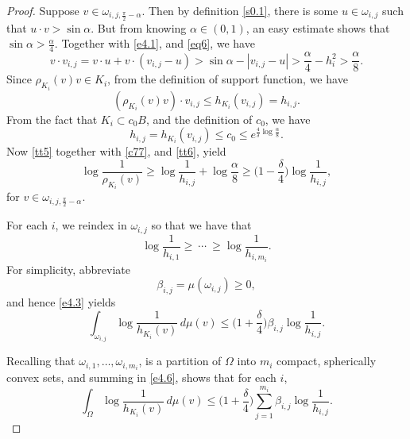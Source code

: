 \documentclass{cpamart1}     %
\theoremstyle{definition}
\theoremstyle{remark}
\begin{document}
\begin{proof}
Suppose $v\in \omega_{i,j,\frac\pi2-\alpha}$.
Then by definition \eqref{s0.1},
there is some $u\in \omega_{i,j}$ such that $u\cdot v>\sin\alpha$.
But from knowing $\alpha\in (0,1)$, an easy estimate shows that
$\sin\alpha > \frac\alpha4$. Together with \eqref{e4.1},
 and \eqref{eq6}, we have
\begin{equation}\label{c77}
v\cdot v_{i,j}= v\cdot u+v\cdot (v_{i,j}-u)>
\sin\alpha-|v_{i,j}-u| > \frac\alpha4-h_i^2 > \frac{\alpha}{8}.
\end{equation}
Since $\rho_{K_i}(v)v\in K_i$, from the definition of support function, we have
\begin{equation}\label{tt5}
(\rho_{K_i}(v)v)\cdot v_{i,j}\leq h_{K_i}(v_{i,j})=h_{i,j}.
\end{equation}
From the fact that $K_i\subset c_0 B$, and the definition of $c_0$, we have
\begin{equation}\label{tt6}
h_{i,j}=h_{K_i}(v_{i,j})\leq c_0\leq e^{\frac{4}{\delta}\log\frac{\alpha}{8}}.
\end{equation}
Now \eqref{tt5} together with \eqref{c77}, and \eqref{tt6}, yield
\begin{equation}\label{e4.4}
\log\frac1{\rho_{K_i}(v)}\geq \log\frac{1}{h_{i,j}}+\log \frac{\alpha}{8}\geq
\Big(1-\frac{\delta}{4}\Big)\log \frac1{h_{i,j}},
\end{equation}
for $v\in \omega_{i,j,\frac\pi2-\alpha}$.

For each $i$, we reindex in $\omega_{i,j}$ so that we have that
\begin{equation}\label{e4.5}
\log \frac1{h_{i,1}}\geq\ \cdots\ \geq  \log \frac1{h_{i,m_i}}.
\end{equation}
For simplicity, abbreviate
$$
\beta_{i,j}=\mu(\omega_{i,j})\geq 0,
$$
and hence \eqref{e4.3} yields
\begin{equation}\label{e4.6}
\int_{\omega_{i,j}}\log\frac1{h_{K_i}(v)}\,d\mu(v)\leq
\big(1+{\textstyle\frac\delta 4}\big)\beta_{i,j}\log \frac1{h_{i,j}}.
\end{equation}

Recalling that
$\omega_{i,1},\ldots, \omega_{i,m_i}$, is a partition of
$\Omega$ into $m_i$ compact, spherically convex sets, and summing in \eqref{e4.6},
shows that for each $i$,
\begin{equation}\label{fff}
\int_{\Omega}\log\frac1{h_{K_i}(v)}\,d\mu(v)\leq
\big(1+{\textstyle\frac\delta 4}\big)\sum_{j=1}^{m_i}\beta_{i,j}\log \frac1{h_{i,j}}.
\end{equation}



\end{proof}
\end{document}
